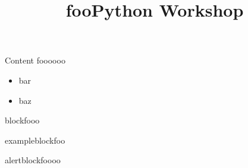 \documentclass[utf8,english,t]{beamer}
\title{foo}
\begin{document}
\title{Python Workshop}
\makebeamertitle

\begin{frame}{Content}
foooooo

\begin{itemize}
	\item bar
	\item baz
\end{itemize}

\begin{block}{block}fooo\end{block}
\begin{exampleblock}{exampleblock}foo\end{exampleblock}
\begin{alertblock}{alertblock}foooo\end{alertblock}

\end{frame}
\end{document}
